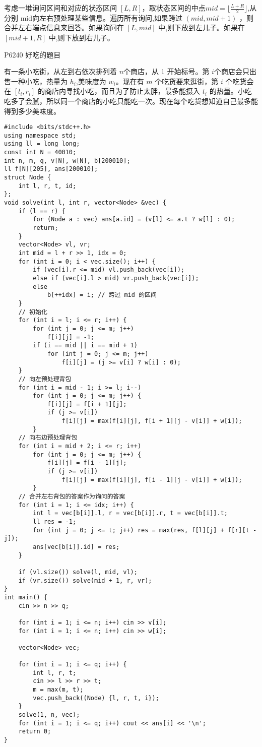 \par 考虑一堆询问区间和对应的状态区间 $[L,R]$，取状态区间的中点$mid=\lfloor\frac{L+R}{2}\rfloor$,从分别 mid向左右预处理某些信息。遍历所有询问,如果跨过 $(mid,mid+1)$ ，则合并左右端点信息来回答。如果询问在 $[L,mid]$ 中,则下放到左儿子。如果在 $[mid+1,R]$ 中,则下放到右儿子。
~\\
\begin{tcolorbox}
\par \noindent P6240 好吃的题目
\par \noindent 有一条小吃街，从左到右依次排列着 $n$个商店，从 1 开始标号。第 $i$个商店会只出售一种小吃，热量为 $h_i$,美味度为 $w_i$。现在有 $m$ 个吃货要来逛街，第 $i$ 个吃货会在 $[l_i,r_i]$ 的商店内寻找小吃，而且为了防止太胖，最多能摄入 $t_i$ 的热量。小吃吃多了会腻，所以同一个商店的小吃只能吃一次。现在每个吃货想知道自己最多能得到多少美味度。
\end{tcolorbox}

\begin{verbatim}
#include <bits/stdc++.h>
using namespace std;
using ll = long long;
const int N = 40010;
int n, m, q, v[N], w[N], b[200010];
ll f[N][205], ans[200010];
struct Node {
    int l, r, t, id;
};
void solve(int l, int r, vector<Node> &vec) {
    if (l == r) {
        for (Node a : vec) ans[a.id] = (v[l] <= a.t ? w[l] : 0);
        return;
    }
    vector<Node> vl, vr;
    int mid = l + r >> 1, idx = 0;
    for (int i = 0; i < vec.size(); i++) {
        if (vec[i].r <= mid) vl.push_back(vec[i]);
        else if (vec[i].l > mid) vr.push_back(vec[i]);
        else
            b[++idx] = i; // 跨过 mid 的区间
    }
    // 初始化
    for (int i = l; i <= r; i++) {
        for (int j = 0; j <= m; j++)
            f[i][j] = -1;
        if (i == mid || i == mid + 1)
            for (int j = 0; j <= m; j++)
                f[i][j] = (j >= v[i] ? w[i] : 0);
    }
    // 向左预处理背包
    for (int i = mid - 1; i >= l; i--)
        for (int j = 0; j <= m; j++) {
            f[i][j] = f[i + 1][j];
            if (j >= v[i])
                f[i][j] = max(f[i][j], f[i + 1][j - v[i]] + w[i]);
        }
    // 向右边预处理背包
    for (int i = mid + 2; i <= r; i++)
        for (int j = 0; j <= m; j++) {
            f[i][j] = f[i - 1][j];
            if (j >= v[i])
                f[i][j] = max(f[i][j], f[i - 1][j - v[i]] + w[i]);
        }
    // 合并左右背包的答案作为询问的答案
    for (int i = 1; i <= idx; i++) {
        int l = vec[b[i]].l, r = vec[b[i]].r, t = vec[b[i]].t;
        ll res = -1;
        for (int j = 0; j <= t; j++) res = max(res, f[l][j] + f[r][t - j]);
        ans[vec[b[i]].id] = res;
    }

    if (vl.size()) solve(l, mid, vl);
    if (vr.size()) solve(mid + 1, r, vr);
}
int main() {
    cin >> n >> q;

    for (int i = 1; i <= n; i++) cin >> v[i];
    for (int i = 1; i <= n; i++) cin >> w[i];

    vector<Node> vec;

    for (int i = 1; i <= q; i++) {
        int l, r, t;
        cin >> l >> r >> t;
        m = max(m, t);
        vec.push_back((Node) {l, r, t, i});
    }
    solve(1, n, vec);
    for (int i = 1; i <= q; i++) cout << ans[i] << '\n';
    return 0;
}
\end{verbatim}

